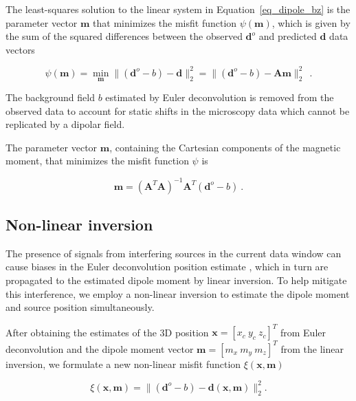     The least-squares solution to the linear system in  Equation~\ref{eq_dipole_bz} is the parameter vector $\mathbf{m}$ that minimizes the misfit function $\psi(\mathbf{m})$, which is given by the sum of the squared differences between the observed  $\mathbf{d}^o$ and predicted $\mathbf{d}$ data vectors

    \begin{equation}
    \label{psi_function}
    \psi(\mathbf{m})
    = \min_{\mathbf{m}} \| (\mathbf{d}^o - b) - \mathbf{d} \|_2^2
    = \| (\mathbf{d}^o - b) - \mathbf{A}\mathbf{m} \|_2^2\
    \ .
    \end{equation}

    \noindent
    The background field $b$ estimated by Euler deconvolution is removed from the observed data to account for static shifts in the microscopy data which cannot be replicated by a dipolar field.

    The parameter vector $\mathbf{m}$, containing the Cartesian components of the magnetic moment, that minimizes the misfit function $\psi$ is

    \begin{equation}
    \label{dipole_moment_solution}
    \mathbf{m} = \left(\mathbf{A}^T \mathbf{A}\right)^{-1} \mathbf{A}^T (\mathbf{d}^o - b)\ .
    \end{equation}


\subsection{Non-linear inversion}

    The presence of signals from interfering sources in the current data window can cause biases in the Euler deconvolution position estimate \citep{Uieda2025}, which in turn are propagated to the estimated dipole moment by linear inversion.
    To help mitigate this interference, we employ a non-linear inversion to estimate the dipole moment and source position simultaneously.

     After obtaining the estimates of the 3D position $\mathbf{x} = [x_{c}\ y_{c}\ z_{c}]^T$ from Euler deconvolution and the dipole moment vector $\mathbf{m} = [m_{x}\ m_{y}\ m_{z}]^T$ from the linear inversion, we formulate a new non-linear misfit function $\xi(\mathbf{x}, \mathbf{m})$

    \begin{equation}
    \label{misfit_equation}
    \xi(\mathbf{x}, \mathbf{m}) =
    \| (\mathbf{d}^o - b) - \mathbf{d}(\mathbf{x}, \mathbf{m}) \|_2^2.
    \end{equation}

